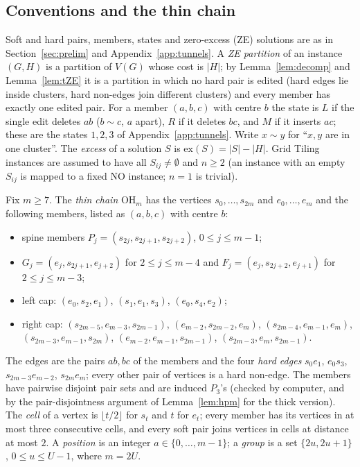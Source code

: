 \subsection{Conventions and the thin chain}\label{sec:hthin}\label{sec:hconv}
Soft and hard pairs, members, states and zero-excess (ZE) solutions are as in Section~\ref{sec:prelim} and Appendix~\ref{app:tunnels}. A \emph{ZE partition} of an instance $(G,H)$ is a partition of $V(G)$ whose cost is $|H|$; by Lemma~\ref{lem:decomp} and Lemma~\ref{lem:tZE} it is a partition in which no hard pair is edited (hard edges lie inside clusters, hard non-edges join different clusters) and every member has exactly one edited pair. For a member $(a,b,c)$ with centre $b$ the state is $L$ if the single edit deletes $ab$ ($b\sim c$, $a$ apart), $R$ if it deletes $bc$, and $M$ if it inserts $ac$; these are the states $1,2,3$ of Appendix~\ref{app:tunnels}. Write $x\sim y$ for ``$x,y$ are in one cluster''. The \emph{excess} of a solution $S$ is $\mathrm{ex}(S)=|S|-|H|$. Grid Tiling instances are assumed to have all $S_{ij}\ne\emptyset$ and $n\ge2$ (an instance with an empty $S_{ij}$ is mapped to a fixed NO instance; $n=1$ is trivial).

 Fix $m\ge7$. The \emph{thin chain} $\mathrm{OH}_m$ has the vertices $s_0,\dots,s_{2m}$ and $e_0,\dots,e_m$ and the following members, listed as $(a,b,c)$ with centre $b$:
\begin{itemize}
\item spine members $P_j=(s_{2j},s_{2j+1},s_{2j+2})$, $0\le j\le m-1$;
\item $G_j=(e_j,s_{2j+1},e_{j+2})$ for $2\le j\le m-4$ and $F_j=(e_j,s_{2j+2},e_{j+1})$ for $2\le j\le m-3$;
\item left cap: $(e_0,s_2,e_1)$, $(s_1,e_1,s_3)$, $(e_0,s_4,e_2)$;
\item right cap: $(s_{2m-5},e_{m-3},s_{2m-1})$, $(e_{m-2},s_{2m-2},e_m)$, $(s_{2m-4},e_{m-1},e_m)$, $(s_{2m-3},e_{m-1},s_{2m})$, $(e_{m-2},e_{m-1},s_{2m-1})$, $(s_{2m-3},e_m,s_{2m-1})$.
\end{itemize}
The edges are the pairs $ab,bc$ of the members and the four \emph{hard edges} $s_0e_1$, $e_0s_3$, $s_{2m-3}e_{m-2}$, $s_{2m}e_m$; every other pair of vertices is a hard non-edge. The members have pairwise disjoint pair sets and are induced $P_3$'s (checked by computer, and by the pair-disjointness argument of Lemma~\ref{lem:hpm} for the thick version). The \emph{cell} of a vertex is $\lfloor t/2\rfloor$ for $s_t$ and $t$ for $e_t$; every member has its vertices in at most three consecutive cells, and every soft pair joins vertices in cells at distance at most $2$. A \emph{position} is an integer $a\in\{0,\dots,m-1\}$; a \emph{group} is a set $\{2u,2u+1\}$, $0\le u\le U-1$, where $m=2U$.

